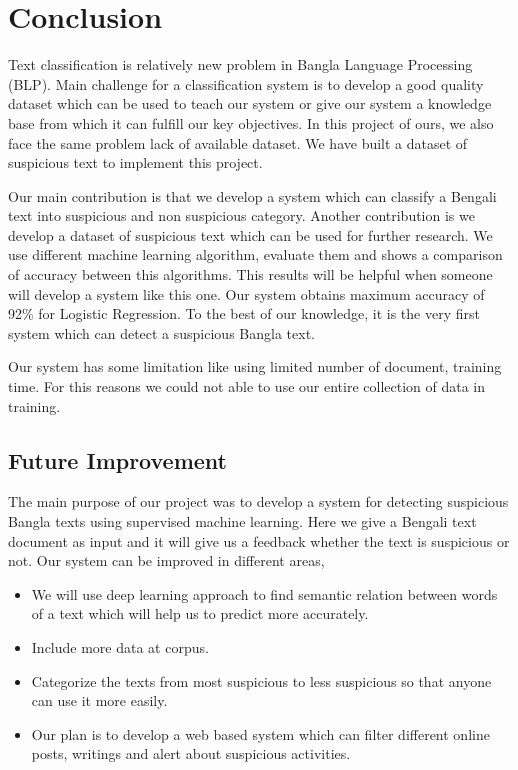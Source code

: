 \chapter{Conclusion}
\thispagestyle{empty}

Text classification is relatively new problem in Bangla Language Processing (BLP). Main challenge for a classification system is to develop a good quality dataset which can be used to teach our system or give our system a knowledge base from which it can fulfill our key objectives. In this project of ours, we also face the same problem lack of available dataset. We have built a dataset of suspicious text to implement this project.\par \vspace{0.5cm}
Our main contribution is that we develop a system which can classify a Bengali text into suspicious and non suspicious category. Another contribution is we develop a dataset of suspicious text which can be used for further research. We use different machine learning algorithm, evaluate them and shows a comparison of accuracy between this algorithms. This results will be helpful when someone will develop a system like this one. Our system obtains maximum accuracy of 92\% for Logistic Regression. To the best of our knowledge, it is the very first system which can detect a suspicious Bangla text.
\par \vspace{0.5cm}
Our system has some limitation like using limited number of document, training time. For this reasons we could not able to use our entire collection of data in training.
\section{Future Improvement}
The main purpose of our project was to develop a system for detecting suspicious Bangla texts using supervised machine learning. Here we give a Bengali text document as input and it will give us a feedback whether the text is suspicious or not. Our system can be improved in different areas,\\
\begin{itemize}
    \item We will use deep learning approach to find semantic relation between words of a text which will help us to predict more accurately.
    \item Include more data at corpus.
    \item Categorize the texts from most suspicious to less suspicious so that anyone can use it more easily.
    \item Our plan is to develop a web based system which can filter different online posts, writings and alert about suspicious activities.
\end{itemize}